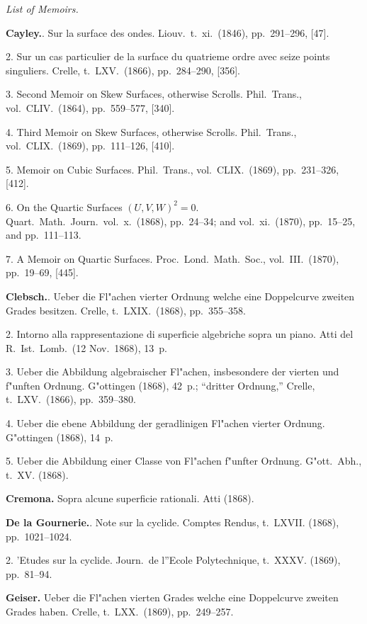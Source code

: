 \documentclass[11pt,a4paper]{article}
\begin{document}
\vspace{0.5em}
\textit{List of Memoirs.}

\textbf{Cayley.}. Sur la surface des ondes. Liouv.\ t.~xi.\ (1846), pp.~291--296, [47].

2. Sur un cas particulier de la surface du quatrieme ordre avec seize points singuliers. Crelle, t.~LXV.\ (1866), pp.~284--290, [356].

3. Second Memoir on Skew Surfaces, otherwise Scrolls. Phil.\ Trans., vol.~CLIV.\ (1864), pp.~559--577, [340].

4. Third Memoir on Skew Surfaces, otherwise Scrolls. Phil.\ Trans., vol.~CLIX.\ (1869), pp.~111--126, [410].

5. Memoir on Cubic Surfaces. Phil.\ Trans., vol.~CLIX.\ (1869), pp.~231--326, [412].

6. On the Quartic Surfaces $(U, V, W)^2 = 0$. Quart.\ Math.\ Journ.\ vol.~x.\ (1868), pp.~24--34; and vol.~xi.\ (1870), pp.~15--25, and pp.~111--113.

7. A Memoir on Quartic Surfaces. Proc.\ Lond.\ Math.\ Soc., vol.~III.\ (1870), pp.~19--69, [445].

\textbf{Clebsch.}. Ueber die Fl"achen vierter Ordnung welche eine Doppelcurve zweiten Grades besitzen. Crelle, t.~LXIX.\ (1868), pp.~355--358.

2. Intorno alla rappresentazione di superficie algebriche sopra un piano. Atti del R.~Ist.~Lomb.\ (12 Nov.~1868), 13~p.

3. Ueber die Abbildung algebraischer Fl"achen, insbesondere der vierten und f"unften Ordnung. G"ottingen (1868), 42~p.;
``dritter Ordnung,'' Crelle, t.~LXV.\ (1866), pp.~359--380.

4. Ueber die ebene Abbildung der geradlinigen Fl"achen vierter Ordnung. G"ottingen (1868), 14~p.

5. Ueber die Abbildung einer Classe von Fl"achen f"unfter Ordnung. G"ott.~Abh., t.~XV. (1868).

\textbf{Cremona.}\quad
Sopra alcune superficie rationali. Atti (1868).

\textbf{De la Gournerie.}. Note sur la cyclide. Comptes Rendus, t.~LXVII. (1868), pp.~1021--1024.

2. 'Etudes sur la cyclide. Journ.~de l''Ecole Polytechnique, t.~XXXV. (1869), pp.~81--94.

\textbf{Geiser.}\quad
Ueber die Fl"achen vierten Grades welche eine Doppelcurve zweiten Grades haben. Crelle, t.~LXX.\ (1869), pp.~249--257.
\end{document}
